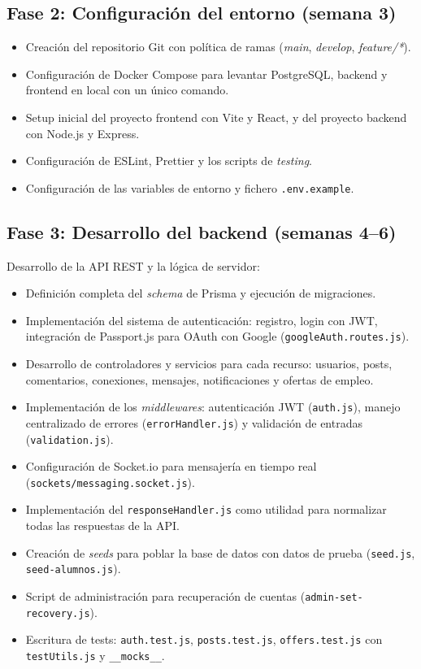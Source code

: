 \documentclass[a4paper]{report}
\begin{document}
\subsection{Fase 2: Configuración del entorno (semana 3)}

\begin{itemize}
  \item Creación del repositorio Git con política de ramas (\textit{main}, \textit{develop}, \textit{feature/*}).
  \item Configuración de Docker Compose para levantar PostgreSQL, backend y frontend en local con un único comando.
  \item Setup inicial del proyecto frontend con Vite y React, y del proyecto backend con Node.js y Express.
  \item Configuración de ESLint, Prettier y los scripts de \textit{testing}.
  \item Configuración de las variables de entorno y fichero \texttt{.env.example}.
\end{itemize}

\subsection{Fase 3: Desarrollo del backend (semanas 4--6)}

Desarrollo de la API REST y la lógica de servidor:

\begin{itemize}
  \item Definición completa del \textit{schema} de Prisma y ejecución de migraciones.
  \item Implementación del sistema de autenticación: registro, login con JWT, integración de Passport.js para OAuth con Google (\texttt{googleAuth.routes.js}).
  \item Desarrollo de controladores y servicios para cada recurso: usuarios, posts, comentarios, conexiones, mensajes, notificaciones y ofertas de empleo.
  \item Implementación de los \textit{middlewares}: autenticación JWT (\texttt{auth.js}), manejo centralizado de errores (\texttt{errorHandler.js}) y validación de entradas (\texttt{validation.js}).
  \item Configuración de Socket.io para mensajería en tiempo real (\texttt{sockets/messaging.socket.js}).
  \item Implementación del \texttt{responseHandler.js} como utilidad para normalizar todas las respuestas de la API.
  \item Creación de \textit{seeds} para poblar la base de datos con datos de prueba (\texttt{seed.js}, \texttt{seed-alumnos.js}).
  \item Script de administración para recuperación de cuentas (\texttt{admin-set-recovery.js}).
  \item Escritura de tests: \texttt{auth.test.js}, \texttt{posts.test.js}, \texttt{offers.test.js} con \texttt{testUtils.js} y \texttt{\_\_mocks\_\_}.
\end{itemize}
\end{document}
